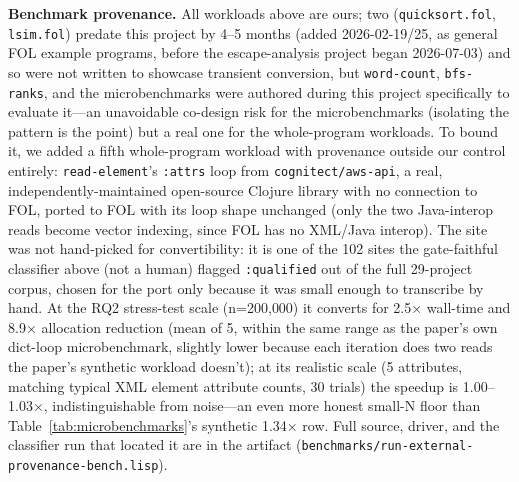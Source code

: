 \documentclass[sigplan,review,anonymous]{acmart}
\begin{document}
\textbf{Benchmark provenance.} All workloads above are ours; two (\texttt{quicksort.fol}, \texttt{lsim.fol}) predate this project by 4--5 months (added 2026-02-19/25, as general FOL example programs, before the escape-analysis project began 2026-07-03) and so were not written to showcase transient conversion, but \texttt{word-count}, \texttt{bfs-ranks}, and the microbenchmarks were authored during this project specifically to evaluate it---an unavoidable co-design risk for the microbenchmarks (isolating the pattern is the point) but a real one for the whole-program workloads. To bound it, we added a fifth whole-program workload with provenance outside our control entirely: \texttt{read-element}'s \texttt{:attrs} loop from \texttt{cognitect/aws-api}, a real, independently-maintained open-source Clojure library with no connection to FOL, ported to FOL with its loop shape unchanged (only the two Java-interop reads become vector indexing, since FOL has no XML/Java interop). The site was not hand-picked for convertibility: it is one of the 102 sites the gate-faithful classifier above (not a human) flagged \texttt{:qualified} out of the full 29-project corpus, chosen for the port only because it was small enough to transcribe by hand. At the RQ2 stress-test scale (n=200{,}000) it converts for 2.5× wall-time and 8.9× allocation reduction (mean of 5, within the same range as the paper's own dict-loop microbenchmark, slightly lower because each iteration does two reads the paper's synthetic workload doesn't); at its realistic scale (5 attributes, matching typical XML element attribute counts, 30 trials) the speedup is 1.00--1.03×, indistinguishable from noise---an even more honest small-N floor than Table~\ref{tab:microbenchmarks}'s synthetic 1.34× row. Full source, driver, and the classifier run that located it are in the artifact (\texttt{benchmarks/run-external-provenance-bench.lisp}).
\end{document}
